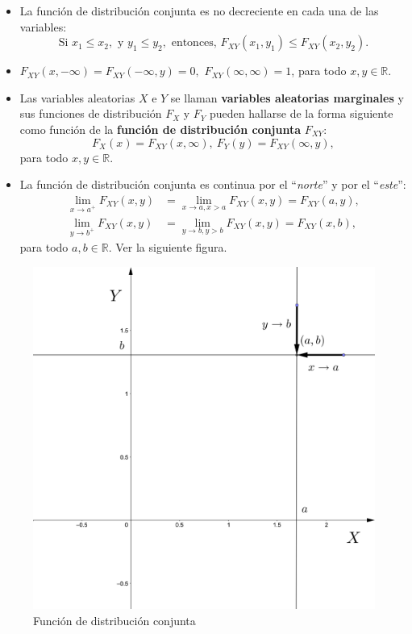 \documentclass[]{book}
\begin{document}
\begin{itemize}
\item
  La función de distribución conjunta es no decreciente en cada una de las variables:
  \[
  \mbox{Si }x_1\leq x_2, \mbox{ y }y_1\leq y_2,\mbox{ entonces, }F_{XY}(x_1,y_1)\leq F_{XY}(x_2,y_2).
  \]
\item
  \(F_{XY}(x,-\infty)=F_{XY}(-\infty,y)=0,\) \(F_{XY}(\infty,\infty)=1\), para todo \(x,y\in\mathbb{R}\).
\item
  Las variables aleatorias \(X\) e \(Y\) se llaman \textbf{variables aleatorias marginales} y sus funciones de distribución \(F_X\) y \(F_Y\) pueden hallarse de la forma siguiente como función de la \textbf{función de distribución conjunta} \(F_{XY}\):
  \[
  F_X(x)=F_{XY}(x,\infty),\ F_Y(y)=F_{XY}(\infty,y),
  \]
  para todo \(x,y\in\mathbb{R}\).
\item
  La función de distribución conjunta es continua por el ``\emph{norte}'' y por el ``\emph{este}'':
  \[
  \begin{array}{rl}
  \lim_{x\to a^+}F_{XY}(x,y) & =\lim_{x\to a, x> a}F_{XY}(x,y)=F_{XY}(a,y), \\
  \lim_{y\to b^+}F_{XY}(x,y) & =\lim_{y\to b, y> b}F_{XY}(x,y)=F_{XY}(x,b),
  \end{array}
  \]
  para todo \(a,b\in\mathbb{R}\). Ver la siguiente figura.
\end{itemize}

\begin{figure}
\centering
\includegraphics{Images/Fxy2.png}
\caption{\label{fig:bid5}Función de distribución conjunta}
\end{figure}
\end{document}
